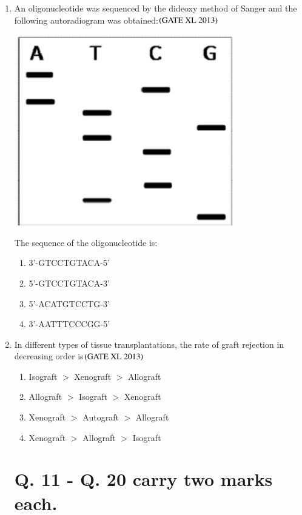 \documentclass[journal]{IEEEtran}
\begin{document}
\begin{enumerate}
\item An oligonucleotide was sequenced by the dideoxy method of Sanger and the following autoradiogram was obtained:\hfill $\left(\text{GATE XL 2013}\right)$
\begin{center}
    \includegraphics[width=0.75\textwidth]{figs/Screenshot 2025-08-05 122205.png}
\end{center}
The sequence of the oligonucleotide is:
\begin{enumerate}
    \item 3'-GTCCTGTACA-5'
    \item 5'-GTCCTGTACA-3'
    \item 5'-ACATGTCCTG-3'
    \item 3'-AATTTCCCGG-5'
\end{enumerate}

\item In different types of tissue transplantations, the rate of graft rejection in decreasing order is\hfill $\left(\text{GATE XL 2013}\right)$
\begin{enumerate}
    \item Isograft $>$ Xenograft $>$ Allograft
    \item Allograft $>$ Isograft $>$ Xenograft
    \item Xenograft $>$ Autograft $>$ Allograft
    \item Xenograft $>$ Allograft $>$ Isograft
\end{enumerate}

\section*{Q. 11 - Q. 20 carry two marks each.}


\end{enumerate}
\end{document}
